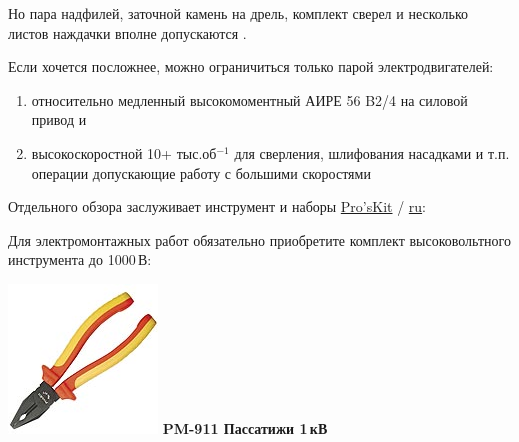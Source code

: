 \documentclass{magazine}
\begin{document}
{Но пара надфилей, заточной камень на дрель, комплект сверел и несколько листов
наждачки вполне допускаются \smiley.

Если хочется посложнее, можно ограничиться только парой электродвигателей:
\begin{enumerate}
  \item 
относительно медленный высокомоментный АИРЕ 56 B2/4 на силовой привод и
\item 
высокоскоростной 10+ тыс.об$^{-1}$ для сверления, шлифования насадками и т.п.
операции допускающие работу с большими скоростями

\end{enumerate}


Отдельного обзора заслуживает инструмент и наборы
\href{http://www.proskit.com/}{Pro'sKit}
 / \href{http://www.proskit.msk.ru/index.html}{ru}:


Для электромонтажных работ обязательно приобретите комплект
высоковольтного инструмента до 1000\,В:

\noindent\includegraphics[width=\columnwidth]{fig/00/pros/PM-911.jpg}
\textbf{PM-911 Пассатижи 1\,кВ}

}
\end{document}
